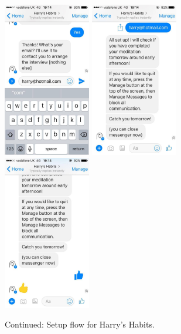 \begin{figure}[H]
  \centering
  \includegraphics[width=1.5in]{resources/design/process/13.jpg}
  \hspace{10px}
  \includegraphics[width=1.5in]{resources/design/process/14.jpg}
  \hspace{10px}
  \includegraphics[width=1.5in]{resources/design/process/15.jpg}
  \caption{Continued: Setup flow for Harry's Habits.}
  \label{fig:setup_flow_screenshots_2}
\end{figure}



\newpage
